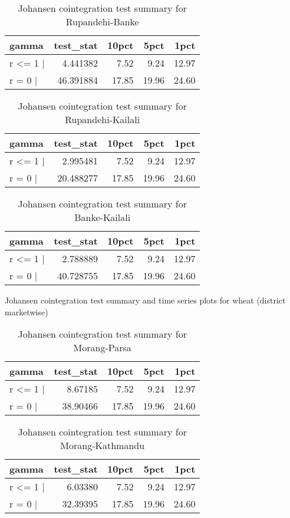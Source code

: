\documentclass[12pt,]{article}
\begin{document}
\begin{longtable}[t]{lrrrr}
\caption{\label{tab:rice-cajo-test}Johansen cointegration test summary for Rupandehi-Banke}\\
\toprule
gamma & test\_stat & 10pct & 5pct & 1pct\\
\midrule
r <= 1 | & 4.441382 & 7.52 & 9.24 & 12.97\\
r = 0  | & 46.391884 & 17.85 & 19.96 & 24.60\\
\bottomrule
\end{longtable}

\begin{longtable}[t]{lrrrr}
\caption{\label{tab:rice-cajo-test}Johansen cointegration test summary for Rupandehi-Kailali}\\
\toprule
gamma & test\_stat & 10pct & 5pct & 1pct\\
\midrule
r <= 1 | & 2.995481 & 7.52 & 9.24 & 12.97\\
r = 0  | & 20.488277 & 17.85 & 19.96 & 24.60\\
\bottomrule
\end{longtable}

\begin{longtable}[t]{lrrrr}
\caption{\label{tab:rice-cajo-test}Johansen cointegration test summary for Banke-Kailali}\\
\toprule
gamma & test\_stat & 10pct & 5pct & 1pct\\
\midrule
r <= 1 | & 2.788889 & 7.52 & 9.24 & 12.97\\
r = 0  | & 40.728755 & 17.85 & 19.96 & 24.60\\
\bottomrule
\end{longtable}

Johansen cointegration test summary and time series plots for wheat (district marketwise)

\begin{longtable}[t]{lrrrr}
\caption{\label{tab:wheat-cajo-test}Johansen cointegration test summary for Morang-Parsa}\\
\toprule
gamma & test\_stat & 10pct & 5pct & 1pct\\
\midrule
r <= 1 | & 8.67185 & 7.52 & 9.24 & 12.97\\
r = 0  | & 38.90466 & 17.85 & 19.96 & 24.60\\
\bottomrule
\end{longtable}

\begin{longtable}[t]{lrrrr}
\caption{\label{tab:wheat-cajo-test}Johansen cointegration test summary for Morang-Kathmandu}\\
\toprule
gamma & test\_stat & 10pct & 5pct & 1pct\\
\midrule
r <= 1 | & 6.03380 & 7.52 & 9.24 & 12.97\\
r = 0  | & 32.39395 & 17.85 & 19.96 & 24.60\\
\bottomrule
\end{longtable}
\end{document}
